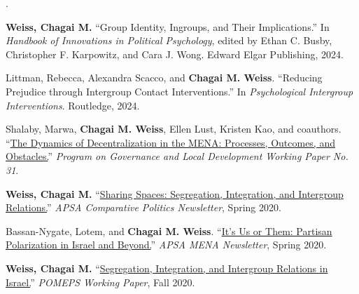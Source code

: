 \documentclass[11pt]{article}
\newcounter{cvpub}
\newenvironment{cvpubs}[1]
  {\setcounter{cvpub}{#1}\addtocounter{cvpub}{1}%
   \RaggedRight\interlinepenalty=150%
   \begin{list}{\addtocounter{cvpub}{-1}\arabic{cvpub}.}%
     {\setlength{\labelwidth}{1.85em}%
      \setlength{\labelsep}{0.45em}%
      \setlength{\leftmargin}{2.30em}%
      \setlength{\rightmargin}{0pt}%
      \setlength{\itemindent}{0pt}%
      \setlength{\listparindent}{0pt}%
      \setlength{\topsep}{0pt}%
      \setlength{\partopsep}{0pt}%
      \setlength{\parsep}{0pt}%
      \setlength{\itemsep}{5.5pt}%
      \renewcommand{\makelabel}[1]{\hfil##1}}}
  {\end{list}}
\begin{document}
\begin{cvpubs}{6}
\item \textbf{Weiss, Chagai M.} ``Group Identity, Ingroups, and Their Implications.'' In \emph{Handbook of Innovations in Political Psychology}, edited by Ethan C. Busby, Christopher F. Karpowitz, and Cara J. Wong. Edward Elgar Publishing, 2024.
\item Littman, Rebecca, Alexandra Scacco, and \textbf{Chagai M. Weiss}. ``Reducing Prejudice through Intergroup Contact Interventions.'' In \emph{Psychological Intergroup Interventions}. Routledge, 2024.
\item Shalaby, Marwa, \textbf{Chagai M. Weiss}, Ellen Lust, Kristen Kao, and coauthors. ``\href{https://papers.ssrn.com/sol3/papers.cfm?abstract_id=3741934}{The Dynamics of Decentralization in the MENA: Processes, Outcomes, and Obstacles.}'' \textit{Program on Governance and Local Development Working Paper No. 31}.
\item \textbf{Weiss, Chagai M.} ``\href{https://www.comparativepoliticsnewsletter.org/wp-content/uploads/2020/06/Spring-Newsletter-2020_11_Weiss.pdf}{Sharing Spaces: Segregation, Integration, and Intergroup Relations.}'' \textit{APSA Comparative Politics Newsletter}, Spring 2020.
\item Bassan-Nygate, Lotem, and \textbf{Chagai M. Weiss}. ``\href{https://apsamena.org/2020/11/19/its-us-or-them-partisan-polarization-in-israel-and-beyond/}{It's Us or Them: Partisan Polarization in Israel and Beyond.}'' \textit{APSA MENA Newsletter}, Spring 2020.
\item \textbf{Weiss, Chagai M.} ``\href{https://pomeps.org/segregation-integration-and-intergroup-relations-in-israel}{Segregation, Integration, and Intergroup Relations in Israel.}'' \emph{POMEPS Working Paper}, Fall 2020.

\end{cvpubs}
\end{document}
